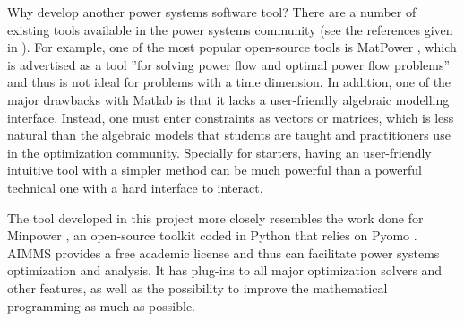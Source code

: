 \documentclass[12pt,LUDisStyle,twosided]{book}
\begin{document}
Why develop another power systems software tool? 
There are a number of existing tools available in the power systems community (see the references given in \cite{greenhall:2012}). For example, one of the most popular open-source tools is MatPower \cite{matpower:2011}, which is advertised as a tool ''for solving power flow and optimal power flow problems'' and thus is not ideal for problems with a time dimension.  In addition, one of the major drawbacks with Matlab is that it lacks a user-friendly algebraic modelling interface.  Instead, one must enter constraints as vectors or matrices, which is less natural than the algebraic models that students are taught and practitioners use in the optimization community. Specially for starters, having an user-friendly intuitive tool with a simpler method can be much powerful than a powerful technical one with a hard interface to interact.

The tool developed in this project more closely resembles the work done for Minpower \cite{greenhall:2012},
an open-source toolkit coded in Python that relies on Pyomo \cite{pyomo:2012}. AIMMS provides a free academic license and thus can facilitate power systems optimization and analysis.
It has plug-ins to all major optimization solvers and other features, as well as the possibility to improve the mathematical programming as much as possible.



\end{document}

